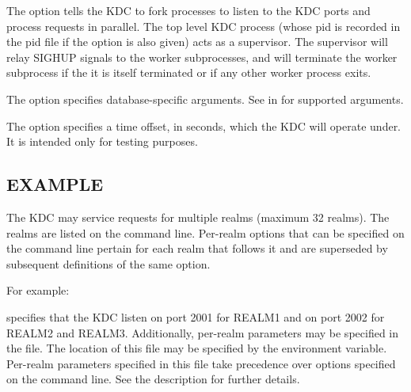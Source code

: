 \documentclass[letterpaper,10pt,english]{sphinxmanual}
\begin{document}
The   option tells the KDC to fork 
processes to listen to the KDC ports and process requests in parallel.
The top level KDC process (whose pid is recorded in the pid file if
the  option is also given) acts as a supervisor.  The supervisor
will relay SIGHUP signals to the worker subprocesses, and will
terminate the worker subprocess if the it is itself terminated or if
any other worker process exits.

The   option specifies database-specific arguments.
See {\hyperref[\detokenize{admin/admin_commands/kadmin_local:dboptions}]{}} in {\hyperref[\detokenize{admin/admin_commands/kadmin_local:kadmin-1}]{}} for
supported arguments.

The   option specifies a time offset, in seconds, which
the KDC will operate under.  It is intended only for testing purposes.


\subsection{EXAMPLE}
\label{\detokenize{admin/admin_commands/krb5kdc:example}}
The KDC may service requests for multiple realms (maximum 32 realms).
The realms are listed on the command line.  Per-realm options that can
be specified on the command line pertain for each realm that follows
it and are superseded by subsequent definitions of the same option.

For example:

%
\begin{sphinxVerbatim}[commandchars=\\\{\}]
          
\end{sphinxVerbatim}

specifies that the KDC listen on port 2001 for REALM1 and on port 2002
for REALM2 and REALM3.  Additionally, per-realm parameters may be
specified in the {\hyperref[\detokenize{admin/conf_files/kdc_conf:kdc-conf-5}]{}} file.  The location of this file
may be specified by the  environment variable.
Per-realm parameters specified in this file take precedence over
options specified on the command line.  See the {\hyperref[\detokenize{admin/conf_files/kdc_conf:kdc-conf-5}]{}}
description for further details.
\end{document}
